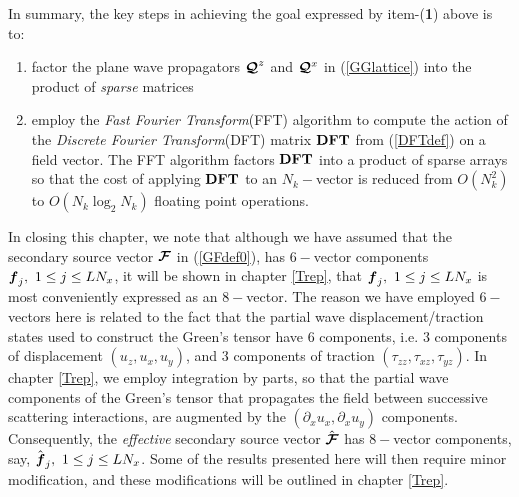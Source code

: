 In summary,
the key steps in achieving the goal expressed by item-({\bf 1}) above is to:
\begin{enumerate} 
\item factor the plane wave propagators ${\mbox{\boldmath$\cal Q$\unboldmath}}^{z}$ and ${\mbox{\boldmath$\cal Q$\unboldmath}}{}^{x}$ 
in (\ref{GGlattice}) into the product of {\em sparse\/} matrices
\item employ the {\em Fast Fourier Transform\/}(FFT) algorithm to compute the
action of the {\em Discrete Fourier Transform\/}(DFT) matrix ${\bf DFT}$ 
from (\ref{DFTdef}) on a field vector. The FFT algorithm factors ${\bf DFT}$ into 
a product of sparse arrays so that the cost of applying ${\bf DFT}$ to an 
$N_k-$vector is reduced from $O(N_k^2)$ to $O(N_k \log_2 N_k)$ floating point 
operations. 
\end{enumerate}
 

In closing this chapter, we note that although we have assumed that the 
secondary source vector ${\mbox{\boldmath$\cal F$\unboldmath}}$ in (\ref{GFdef0}), has $6-$vector components
${\mbox{\boldmath$\mit f$\unboldmath}}_j, \ 1 \le j \le L N_x$, it will be shown in chapter \ref{Trep}, that
${\mbox{\boldmath$\mit f$\unboldmath}}_j, \ 1 \le j \le L N_x$ is most conveniently expressed as an 
$8-$vector. The reason we have employed $6-$vectors here is related to 
the fact that the partial wave displacement/traction states  used to 
construct the Green's tensor have $6$ components, i.e. $3 $ components 
of displacement $(u_z,u_x,u_y)$, and $3$ components of traction
$(\tau_{zz},\tau_{xz},\tau_{yz})$. In chapter \ref{Trep}, 
we employ  integration by parts, so that the partial wave components of 
the Green's tensor that propagates the field between successive scattering 
interactions, are augmented by the $(\partial_{x}u_x,\partial_{x}u_y)$ 
components. Consequently, the {\em effective\/} 
secondary source vector $\hat{\mbox{\boldmath$\cal F$\unboldmath}}$ has $8-$vector components, say,
$\hat{\mbox{\boldmath$\mit f$\unboldmath}}_j, \ 1 \le j \le L N_x$. Some of the results presented here 
will then require minor modification, and these modifications will be 
outlined in chapter \ref{Trep}.




